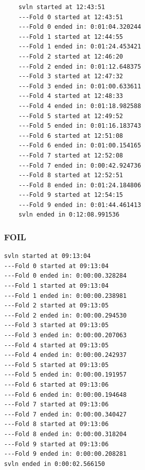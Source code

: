 \begin{verbatim}
	svln started at 12:43:51
	---Fold 0 started at 12:43:51
	---Fold 0 ended in: 0:01:04.320244
	---Fold 1 started at 12:44:55
	---Fold 1 ended in: 0:01:24.453421
	---Fold 2 started at 12:46:20
	---Fold 2 ended in: 0:01:12.648375
	---Fold 3 started at 12:47:32
	---Fold 3 ended in: 0:01:00.633611
	---Fold 4 started at 12:48:33
	---Fold 4 ended in: 0:01:18.982588
	---Fold 5 started at 12:49:52
	---Fold 5 ended in: 0:01:16.183743
	---Fold 6 started at 12:51:08
	---Fold 6 ended in: 0:01:00.154165
	---Fold 7 started at 12:52:08
	---Fold 7 ended in: 0:00:42.924736
	---Fold 8 started at 12:52:51
	---Fold 8 ended in: 0:01:24.184806
	---Fold 9 started at 12:54:15
	---Fold 9 ended in: 0:01:44.461413
	svln ended in 0:12:08.991536
\end{verbatim}
\subsubsection{FOIL}

\begin{verbatim}
svln started at 09:13:04
---Fold 0 started at 09:13:04
---Fold 0 ended in: 0:00:00.328284
---Fold 1 started at 09:13:04
---Fold 1 ended in: 0:00:00.238981
---Fold 2 started at 09:13:05
---Fold 2 ended in: 0:00:00.294530
---Fold 3 started at 09:13:05
---Fold 3 ended in: 0:00:00.207063
---Fold 4 started at 09:13:05
---Fold 4 ended in: 0:00:00.242937
---Fold 5 started at 09:13:05
---Fold 5 ended in: 0:00:00.191957
---Fold 6 started at 09:13:06
---Fold 6 ended in: 0:00:00.194648
---Fold 7 started at 09:13:06
---Fold 7 ended in: 0:00:00.340427
---Fold 8 started at 09:13:06
---Fold 8 ended in: 0:00:00.318204
---Fold 9 started at 09:13:06
---Fold 9 ended in: 0:00:00.208281
svln ended in 0:00:02.566150
\end{verbatim}

